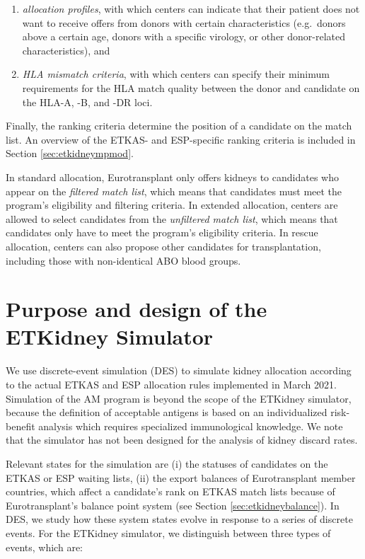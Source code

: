 \documentclass[11pt,twoside,]{book}
\providecommand{\tightlist}{%
  \setlength{\itemsep}{0pt}\setlength{\parskip}{0pt}}
\begin{document}
\begin{enumerate}
\def\labelenumi{\arabic{enumi}.}
\tightlist
\item
  \emph{allocation profiles}, with which centers can indicate that their
  patient does not want to receive offers from donors with certain
  characteristics (e.g.~donors above a certain age, donors with a specific
  virology, or other donor-related characteristics), and
\item
  \emph{HLA mismatch criteria}, with which centers can specify their minimum
  requirements for the HLA match quality between the donor and
  candidate on the HLA-A, -B, and -DR loci.
\end{enumerate}

Finally, the ranking criteria determine the position of a candidate on the
match list. An overview of the ETKAS- and ESP-specific ranking criteria is included
in Section \ref{sec:etkidneympmod}.

In standard allocation, Eurotransplant only offers kidneys to candidates
who appear on the \emph{filtered match list}, which means that candidates must
meet the program's eligibility and filtering criteria. In extended allocation,
centers are allowed to select candidates from the \emph{unfiltered match list},
which means that candidates only have to meet the program's eligibility criteria.
In rescue allocation, centers can also propose other candidates
for transplantation, including those with non-identical ABO blood groups.

\section{Purpose and design of the ETKidney Simulator}\label{sec:etkidneydesign}

We use discrete-event simulation (DES) to simulate kidney allocation according to the
actual ETKAS and ESP allocation rules implemented in March 2021. Simulation of
the AM program is beyond the scope of the ETKidney simulator, because
the definition of acceptable antigens is based on an individualized
risk-benefit analysis which requires specialized immunological
knowledge. We note that the simulator has not been designed for the analysis of
kidney discard rates.

Relevant states for the simulation are (i) the statuses of candidates on the ETKAS or ESP
waiting lists, (ii) the export
balances of Eurotransplant member countries, which affect a candidate's
rank on ETKAS match lists because of Eurotransplant's balance point
system (see Section \ref{sec:etkidneybalance}). In DES, we study how these system states
evolve in response to a series of discrete events. For the ETKidney
simulator, we distinguish between three types of events, which are:
\end{document}
